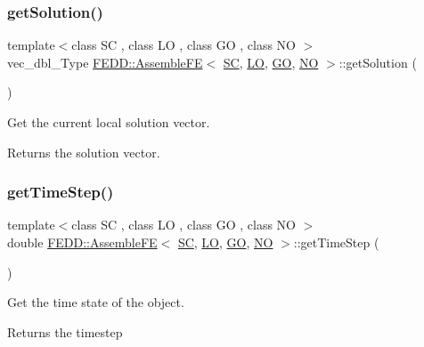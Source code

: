 \subsubsection{\texorpdfstring{get\+Solution()}{getSolution()}}
{\footnotesize\ttfamily template$<$class SC , class LO , class GO , class NO $>$ \\
vec\+\_\+dbl\+\_\+\+Type \hyperlink{classFEDD_1_1AssembleFE}{F\+E\+D\+D\+::\+Assemble\+FE}$<$ \hyperlink{fe__test__laplace_8cpp_a79c7e86a57edbb2a5a53242bcd04e41e}{SC}, \hyperlink{fe__test__laplace_8cpp_ad6a38c9f07d3fd633eefca5bccad8410}{LO}, \hyperlink{fe__test__laplace_8cpp_afa2946b509009b4f45eb04bd8c5b27d9}{GO}, \hyperlink{fe__test__laplace_8cpp_a5e24f37b28787429872b6ecb1d0417ce}{NO} $>$\+::get\+Solution (\begin{DoxyParamCaption}{ }\end{DoxyParamCaption})}



Get the current local solution vector. 

\begin{DoxyReturn}{Returns}
the solution vector. 
\end{DoxyReturn}
\mbox{\label{classFEDD_1_1AssembleFE_a960875e7038a3f20e4507bc86f17247f}} 
\subsubsection{\texorpdfstring{get\+Time\+Step()}{getTimeStep()}}
{\footnotesize\ttfamily template$<$class SC , class LO , class GO , class NO $>$ \\
double \hyperlink{classFEDD_1_1AssembleFE}{F\+E\+D\+D\+::\+Assemble\+FE}$<$ \hyperlink{fe__test__laplace_8cpp_a79c7e86a57edbb2a5a53242bcd04e41e}{SC}, \hyperlink{fe__test__laplace_8cpp_ad6a38c9f07d3fd633eefca5bccad8410}{LO}, \hyperlink{fe__test__laplace_8cpp_afa2946b509009b4f45eb04bd8c5b27d9}{GO}, \hyperlink{fe__test__laplace_8cpp_a5e24f37b28787429872b6ecb1d0417ce}{NO} $>$\+::get\+Time\+Step (\begin{DoxyParamCaption}{ }\end{DoxyParamCaption})}



Get the time state of the object. 

\begin{DoxyReturn}{Returns}
the timestep 
\end{DoxyReturn}
\mbox{\label{classFEDD_1_1AssembleFE_a4d5d128fbd72747e01af917b16cee6f6}} 
